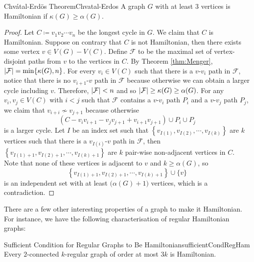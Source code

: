 \documentclass[math]{amznotes}
\theoremstyle{remark}
\newcommand{\0}{\mathbf{0}}
\newcommand{\1}{\mathbf{1}}
\begin{document}
\begin{thmbox}{Chv\'{a}tal-Erd\"{o}s Theorem}{Chvatal-Erdos}
    A graph $G$ with at least $3$ vertices is Hamiltonian if $\kappa(G) \geq \alpha(G)$.
    \tcblower
    \begin{proof}
        Let $C \coloneqq v_1v_2\cdots v_n$ be the longest cycle in $G$. We claim that $C$ is Hamiltonian. Suppose on contrary that $C$ is not Hamiltonian, then there exists some vertex $v \in V(G) - V(C)$. Define $\mathcal{F}$ to be the maximal set of vertex-disjoint paths from $v$ to the vertices in $C$. By Theorem \ref{thm:Menger}, ${\left\lvert {\mathcal{F}} \right\rvert} = \min\{\kappa(G), n\}$. For every $v_i \in V(C)$ such that there is a $v$-$v_i$ path in $\mathcal{F}$, notice that there is no $v_{i + 1}$-$v$ path in $\mathcal{F}$ because otherwise we can obtain a larger cycle including $v$. Therefore, ${\left\lvert {\mathcal{F}} \right\rvert} < n$ and so ${\left\lvert {\mathcal{F}} \right\rvert} \geq \kappa(G) \geq \alpha(G)$. For any $v_i, v_j \in V(C)$ with $i < j$ such that $\mathcal{F}$ contains a $v$-$v_i$ path $P_i$ and a $v$-$v_j$ path $P_j$, we claim that $v_{i + i} \not\sim v_{j + 1}$ because otherwise 
        \begin{equation*}
            \left(C - v_iv_{i + 1} - v_jv_{j + 1} + v_{i + 1}v_{j + 1}\right) \cup P_i \cup P_j
        \end{equation*}
        is a larger cycle. Let $I$ be an index set such that $\left\{v_{I(1)}, v_{I(2)}, \cdots, v_{I(k)}\right\}$ are $k$ vertices such that there is a $v_{I(i)}$-$v$ path in $\mathcal{F}$, then $\left\{v_{I(1) + 1}, v_{I(2) + 1}, \cdots, v_{I(k) + 1}\right\}$ are $k$ pair-wise non-adjacent vertices in $C$. Note that none of these vertices is adjacent to $v$ and $k \geq \alpha(G)$, so 
        \begin{equation*}
            \left\{v_{I(1) + 1}, v_{I(2) + 1}, \cdots, v_{I(k) + 1}\right\} \cup \{v\}
        \end{equation*}
        is an independent set with at least $\bigl(\alpha(G) + 1\bigr)$ vertices, which is a contradiction.
    \end{proof}
\end{thmbox}
There are a few other interesting properties of a graph to make it Hamiltonian. For instance, we have the following characterisation of regular Hamiltonian graphs:
\begin{probox}{Sufficient Condition for Regular Graphs to Be Hamiltonian}{sufficientCondRegHam}
    Every $2$-connected $k$-regular graph of order at most $3k$ is Hamiltonian.
\end{probox}
\end{document}
